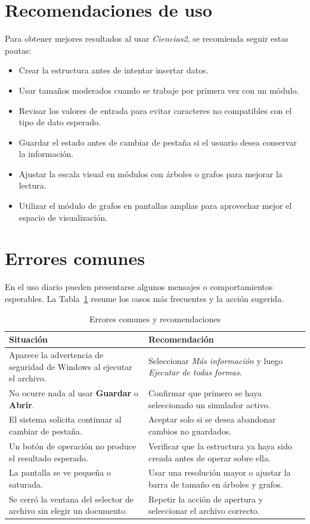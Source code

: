\documentclass[10pt,onecolumn]{IEEEtran}
\begin{document}
\section{Recomendaciones de uso}
Para obtener mejores resultados al usar \textit{Ciencias2}, se recomienda seguir estas pautas:
\begin{itemize}
  \item Crear la estructura antes de intentar insertar datos.
  \item Usar tamaños moderados cuando se trabaje por primera vez con un módulo.
  \item Revisar los valores de entrada para evitar caracteres no compatibles con el tipo de dato esperado.
  \item Guardar el estado antes de cambiar de pestaña si el usuario desea conservar la información.
  \item Ajustar la escala visual en módulos con árboles o grafos para mejorar la lectura.
  \item Utilizar el módulo de grafos en pantallas amplias para aprovechar mejor el espacio de visualización.
\end{itemize}

\section{Errores comunes}
En el uso diario pueden presentarse algunos mensajes o comportamientos esperables. La Tabla~\ref{tab:errores} resume los casos más frecuentes y la acción sugerida.

\begin{table}[H]
\centering
\caption{Errores comunes y recomendaciones}
\label{tab:errores}
\begin{tabularx}{0.96\linewidth}{>{\raggedright\arraybackslash}p{4cm}X}
\toprule
\textbf{Situación} & \textbf{Recomendación} \\
\midrule
Aparece la advertencia de seguridad de Windows al ejecutar el archivo. & Seleccionar \textit{Más información} y luego \textit{Ejecutar de todas formas}. \\
No ocurre nada al usar \textbf{Guardar} o \textbf{Abrir}. & Confirmar que primero se haya seleccionado un simulador activo. \\
El sistema solicita continuar al cambiar de pestaña. & Aceptar solo si se desea abandonar cambios no guardados. \\
Un botón de operación no produce el resultado esperado. & Verificar que la estructura ya haya sido creada antes de operar sobre ella. \\
La pantalla se ve pequeña o saturada. & Usar una resolución mayor o ajustar la barra de tamaño en árboles y grafos. \\
Se cerró la ventana del selector de archivo sin elegir un documento. & Repetir la acción de apertura y seleccionar el archivo correcto. \\
\bottomrule
\end{tabularx}
\end{table}
\end{document}
